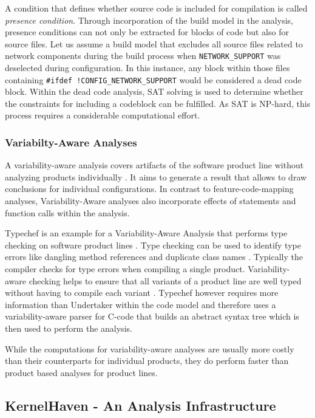 \documentclass[a4paper]{article}
\begin{document}
A condition that defines whether source code is included for compilation is called \emph{presence condition}. Through incorporation of the build model in the analysis, presence conditions can not only be extracted for blocks of code but also for source files. Let us assume a build model that excludes all source files related to network components during the build process when \texttt{NETWORK\_SUPPORT} was deselected during configuration. In this instance, any block within those files containing \texttt{\#ifdef !CONFIG\_NETWORK\_SUPPORT} would be considered a dead code block. Within the dead code analysis, SAT solving is used to determine whether the constraints for including a codeblock can be fulfilled. As SAT is NP-hard, this process requires a considerable computational effort.

\subsubsection{Variabilty-Aware Analyses}

A variability-aware analysis covers artifacts of the software product line without analyzing products individually \cite[p.261]{Apel:2013:FSP:2541773}. It aims to generate a result that allows to draw conclusions for individual configurations. In contrast to feature-code-mapping analyses, Variability-Aware analyses also incorporate effects of statements and function calls within the analysis.

Typechef is an example for a Variability-Aware Analysis that performs type checking on software product lines \cite{Dietrich:2012:RAV:2362536.2362544}. Type checking can be used to identify type errors like dangling method references and duplicate class names \cite{Thum:2014:CSA:2620784.2580950}. Typically the compiler checks for type errors when compiling a single product.  Variability-aware  checking helps to ensure that all variants of a product line are well typed without having to compile each variant \cite{Kenner:2010:TTT:1868688.1868693}. Typechef however requires more information than Undertaker within the code model and therefore uses a variability-aware parser for C-code that builds an abstract syntax tree which is then used to perform the analysis.

While the computations for variability-aware analyses are usually more costly than their counterparts for individual products, they do perform faster than product based analyses for product lines.

\subsection{KernelHaven - An Analysis Infrastructure}\label{kernelhaven}
\end{document}
